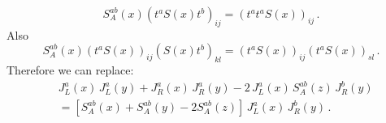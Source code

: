 \documentclass[11pt,a4paper]{article}
\begin{document}
\begin{equation}%
S_{A}^{ab}(x)(t^{a}S(x)t^{b})_{ij}%
=(t^{a}t^{a}S(x))_{ij}\,.
\end{equation}
Also
\begin{equation}%
S_{A}^{ab}(x)(t^{a}S(x))_{ij}(S(x)t^{b})_{kl}%
=(t^{a}S(x))_{ij}(t^{a}S(x))_{sl}\,.
\end{equation}
Therefore we can replace:
\begin{equation}\begin{split}
&J_{L}^{a}(x)\, J_{L}^{a}(y)+J_{R}^{a}(x)\, J_{R}^{a}(y)-2\, J_{L}^{a}(x)\, S_{A}^{ab}(z)\, J_{R}^{b}(y)\\
&=\left[S_{A}^{ab}(x)+S_{A}^{ab}(y)-2S_{A}^{ab}(z)\right]\, J_{L}^{a}(x)\, J_{R}^{b}(y)\,.
\end{split}\end{equation}
\end{document}
